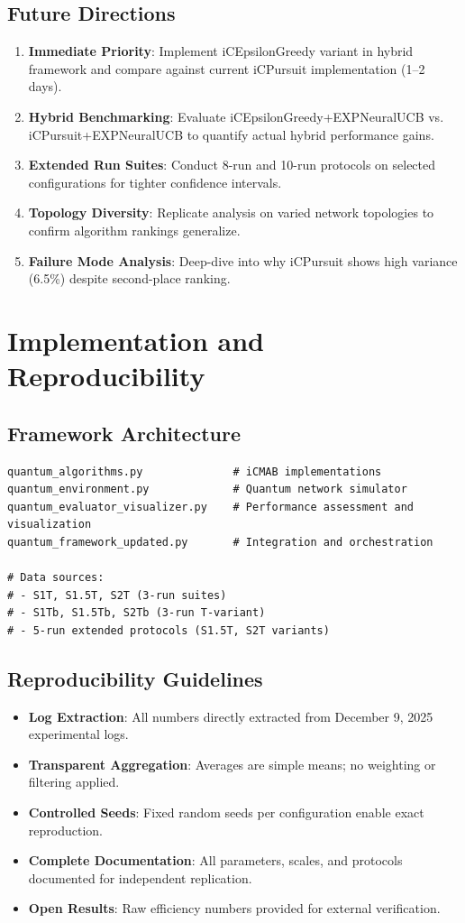 \documentclass[12pt,a4paper]{article}
\begin{document}
\subsection{Future Directions}
\begin{enumerate}
\item \textbf{Immediate Priority}: Implement iCEpsilonGreedy variant in hybrid framework and compare against current iCPursuit implementation (1--2 days).
\item \textbf{Hybrid Benchmarking}: Evaluate iCEpsilonGreedy+EXPNeuralUCB vs. iCPursuit+EXPNeuralUCB to quantify actual hybrid performance gains.
\item \textbf{Extended Run Suites}: Conduct 8-run and 10-run protocols on selected configurations for tighter confidence intervals.
\item \textbf{Topology Diversity}: Replicate analysis on varied network topologies to confirm algorithm rankings generalize.
\item \textbf{Failure Mode Analysis}: Deep-dive into why iCPursuit shows high variance (6.5\%) despite second-place ranking.
\end{enumerate}

\section{Implementation and Reproducibility}

\subsection{Framework Architecture}
\begin{lstlisting}[caption=Core iCMAB Framework Components]
quantum_algorithms.py              # iCMAB implementations
quantum_environment.py             # Quantum network simulator
quantum_evaluator_visualizer.py    # Performance assessment and visualization
quantum_framework_updated.py       # Integration and orchestration

# Data sources:
# - S1T, S1.5T, S2T (3-run suites)
# - S1Tb, S1.5Tb, S2Tb (3-run T-variant)
# - 5-run extended protocols (S1.5T, S2T variants)
\end{lstlisting}

\subsection{Reproducibility Guidelines}
\begin{itemize}
\item \textbf{Log Extraction}: All numbers directly extracted from December 9, 2025 experimental logs.
\item \textbf{Transparent Aggregation}: Averages are simple means; no weighting or filtering applied.
\item \textbf{Controlled Seeds}: Fixed random seeds per configuration enable exact reproduction.
\item \textbf{Complete Documentation}: All parameters, scales, and protocols documented for independent replication.
\item \textbf{Open Results}: Raw efficiency numbers provided for external verification.
\end{itemize}
\end{document}

